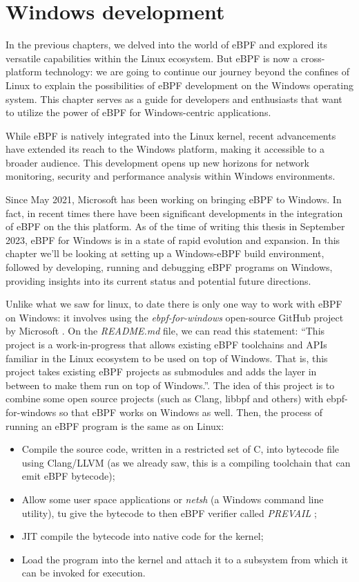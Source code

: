 \chapter{Windows development}

In the previous chapters, we delved into the world of eBPF and explored its versatile capabilities within the Linux ecosystem.
But eBPF is now a cross-platform technology: we are going to continue our journey beyond the confines of Linux to explain the possibilities of eBPF development on the Windows operating system. 
This chapter serves as a guide for developers and enthusiasts that want to utilize the power of eBPF for Windows-centric applications.

While eBPF is natively integrated into the Linux kernel, recent advancements have extended its reach to the Windows platform, making it accessible to a broader audience. 
This development opens up new horizons for network monitoring, security and performance analysis within Windows environments.

Since May 2021, Microsoft has been working on bringing eBPF to Windows. 
In fact, in recent times there have been significant developments in the integration of eBPF on the this platform. 
As of the time of writing this thesis in September 2023, eBPF for Windows is in a state of rapid evolution and expansion. 
In this chapter we’ll be looking at setting up a Windows-eBPF build environment, followed by developing, running and debugging eBPF programs on Windows, providing insights into its current status and potential future directions. 

Unlike what we saw for linux, to date there is only one way to work with eBPF on Windows: it involves using the \textit{ebpf-for-windows} open-source GitHub project by Microsoft \cite{eBPFWinGitHubRepo}.
On the \textit{README.md} file, we can read this statement: 
``This project is a work-in-progress that allows existing eBPF toolchains and APIs familiar in the Linux ecosystem to be used on top of Windows. 
That is, this project takes existing eBPF projects as submodules and adds the layer in between to make them run on top of Windows.''.
The idea of this project is to combine some open source projects (such as Clang, libbpf and others) with ebpf-for-windows so that eBPF works on Windows as well.
Then, the process of running an eBPF program is the same as on Linux:

\begin{itemize}
	\item 
		Compile the source code, written in a restricted set of C, into bytecode file using Clang/LLVM (as we already saw, this is a compiling toolchain that can emit eBPF bytecode);
	\item 
		Allow some user space applications or \textit{netsh} (a Windows command line utility), tu give the bytecode to then eBPF verifier called \textit{PREVAIL} \cite{PrevailVerifier};
	\item 
		JIT compile the bytecode into native code for the kernel;
	\item 
		Load the program into the kernel and attach it to a subsystem from which it can be invoked for execution.
\end{itemize}

